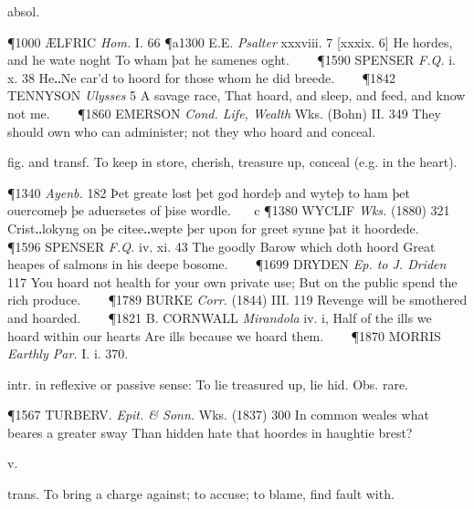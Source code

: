 \begin{description}[wide, labelwidth=!, labelindent=0pt]
\begin{myenumerate}
 absol.

\P 1000 ÆLFRIC  \textit{Hom.} I. 66 
\P a1300 E.E.  \textit{Psalter} xxxviii. 7 [xxxix. 6] He hordes, and he wate noght To wham þat he samenes oght.    
\P 1590 SPENSER  \textit{F.Q.} i. x. 38 He‥Ne car'd to hoord for those whom he did breede.    
\P 1842 TENNYSON  \textit{Ulysses} 5 A savage race, That hoard, and sleep, and feed, and know not me.    
\P 1860 EMERSON  \textit{Cond. Life, Wealth} Wks. (Bohn) II. 349 They should own who can administer; not they who hoard and conceal.

 fig. and transf. To keep in store, cherish, treasure up, conceal (e.g. in the heart).

\P 1340  \textit{Ayenb.} 182 Þet greate lost þet god hordeþ and wyteþ to ham þet ouercomeþ þe aduersetes of þise wordle.    c 
\P 1380 WYCLIF  \textit{Wks.} (1880) 321 Crist‥lokyng on þe citee‥wepte þer upon for greet synne þat it hoordede.    
\P 1596 SPENSER  \textit{F.Q.} iv. xi. 43 The goodly Barow which doth hoord Great heapes of salmons in his deepe bosome.    
\P 1699 DRYDEN  \textit{Ep. to J. Driden} 117 You hoard not health for your own private use; But on the public spend the rich produce.    
\P 1789 BURKE  \textit{Corr.} (1844) III. 119 Revenge will be smothered and hoarded.    
\P 1821 B. CORNWALL  \textit{Mirandola} iv. i, Half of the ills we hoard within our hearts Are ills because we hoard them.    
\P 1870 MORRIS  \textit{Earthly Par.} I. i. 370.

 intr. in reflexive or passive sense: To lie treasured up, lie hid. Obs. rare.

\P 1567 TURBERV.  \textit{Epit. \& Sonn.} Wks. (1837) 300 In common weales what beares a greater sway Than hidden hate that hoordes in haughtie brest?
\end{myenumerate}


 v.

\noindent {}

\vspace{-0.3cm}

\begin{myenumerate}

 trans. To bring a charge against; to accuse; to blame, find fault with.


\end{myenumerate}
\end{description}
